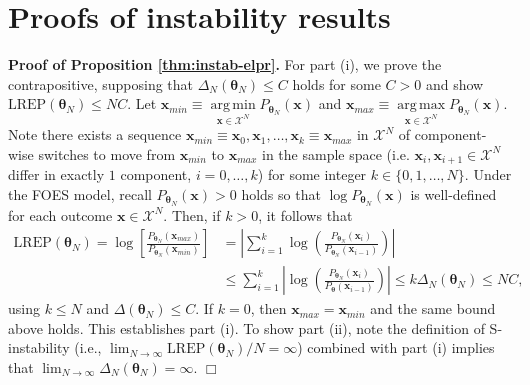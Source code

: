 \documentclass[]{article}
\theoremstyle{definition}
\DeclareMathOperator*{\argmin}{arg\,min}
\DeclareMathOperator*{\argmax}{arg\,max}
\newcommand{\REP}{\mathrm{LREP}}
\newcommand{\DN}{\Delta_N}
\begin{document}
\clearpage

\appendix


\section{Proofs of instability results}\label{appendix-instab}

\textbf{Proof of Proposition \ref{thm:instab-elpr}.} For part (i), we
prove the contrapositive, supposing that
\(\DN(\boldsymbol \theta_N) \le C\) holds for some \(C > 0\) and show
\(\REP(\boldsymbol \theta_N) \leq NC\). Let
\(\boldsymbol x_{min} \equiv \argmin\limits_{\boldsymbol x \in \mathcal{X}^N}P_{\boldsymbol \theta_N}(\boldsymbol x)\)
and
\(\boldsymbol x_{max} \equiv \argmax\limits_{\boldsymbol x \in \mathcal{X}^N}P_{\boldsymbol \theta_N}(\boldsymbol x)\).
Note there exists a sequence
\(\boldsymbol x_{min} \equiv \boldsymbol x_0, \boldsymbol x_1, \dots, \boldsymbol x_k \equiv \boldsymbol x_{max}\)
in \(\mathcal{X}^N\) of component-wise switches to move from
\(\boldsymbol x_{min}\) to \(\boldsymbol x_{max}\) in the sample space
(i.e. \(\boldsymbol x_i, \boldsymbol x_{i + 1} \in \mathcal{X}^N\)
differ in exactly \(1\) component, \(i = 0, \dots, k\)) for some integer
\(k \in \{0, 1, \dots, N\}\). Under the FOES model, recall
\(P_{\boldsymbol \theta_N}(\boldsymbol x) > 0\) holds so that
\(\log P_{\boldsymbol \theta_N}(\boldsymbol x)\) is well-defined for
each outcome \(\boldsymbol x \in \mathcal{X}^N\). Then, if \(k > 0\), it
follows that
\begin{align*}
\REP(\boldsymbol \theta_N) = \log\left[\frac{P_{\boldsymbol \theta_N}(\boldsymbol x_{max})}{P_{\boldsymbol \theta_N}(\boldsymbol x_{min})}\right] &= \left|\sum\limits_{i = 1}^k\log\left(\frac{P_{\boldsymbol \theta_N}(\boldsymbol x_i)}{P_{\boldsymbol \theta_N}(\boldsymbol x_{i-1})}\right)\right| \\
&\le \sum\limits_{i = 1}^k\left|\log\left(\frac{P_{\boldsymbol \theta_N}(\boldsymbol x_i)}{P_{\boldsymbol \theta}(\boldsymbol x_{i-1})}\right)\right| \le k \Delta_N(\boldsymbol \theta_N) \le NC,
\end{align*}
using \(k \le N\) and \(\Delta(\boldsymbol \theta_N) \le C\). If
\(k = 0\), then \(\boldsymbol x_{max} = \boldsymbol x_{min}\) and the
same bound above holds. This establishes part (i). To show part (ii),
note the definition of S-instability (i.e.,
\(\lim_{N\to \infty}\REP(\boldsymbol \theta_N)/N= \infty\)) combined
with part (i) implies that
\(\lim_{N\to \infty}\DN(\boldsymbol \theta_N)=\infty\). \hfill \(\Box\)
\end{document}
